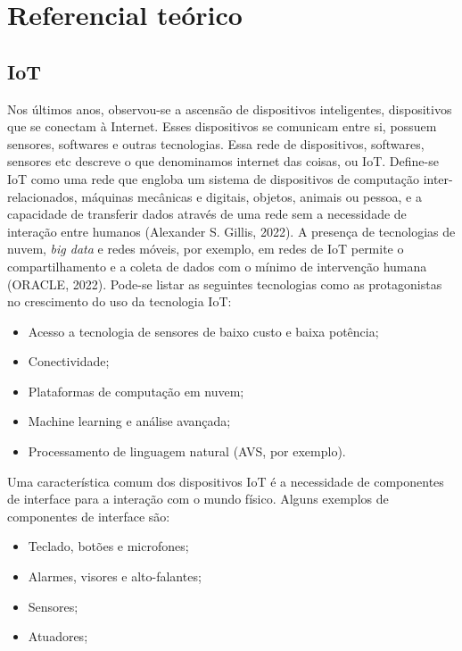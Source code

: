 \chapter{Referencial teórico}


\section{IoT}
Nos últimos anos, observou-se a ascensão de dispositivos inteligentes, dispositivos que se conectam à Internet. Esses dispositivos se comunicam entre si, possuem sensores, softwares e outras tecnologias. Essa rede de dispositivos, softwares, sensores etc descreve o que denominamos internet das coisas, ou IoT. Define-se IoT como uma rede que engloba um sistema de dispositivos de computação inter-relacionados, máquinas mecânicas e digitais, objetos, animais ou pessoa, e a capacidade de transferir dados através de uma rede sem a necessidade de interação entre humanos (Alexander S. Gillis, 2022). A presença de tecnologias de nuvem, \textit{big data} e redes móveis, por exemplo, em redes de IoT permite o compartilhamento e a coleta de dados com o mínimo de intervenção humana (ORACLE, 2022). Pode-se listar as seguintes tecnologias como as protagonistas no crescimento do uso da tecnologia IoT:
\begin{itemize}
	\item Acesso a tecnologia de sensores de baixo custo e baixa potência;
	\item Conectividade;
	\item Plataformas de computação em nuvem;
	\item Machine learning e análise avançada;
	\item Processamento de linguagem natural (AVS, por exemplo).
\end{itemize}

Uma característica comum dos dispositivos IoT é a necessidade de componentes de interface para a interação com o mundo físico. Alguns exemplos de componentes de interface são:
\begin{itemize}
	\item Teclado, botões e microfones;
	\item Alarmes, visores e alto-falantes;
	\item Sensores;
	\item Atuadores;
\end{itemize}

